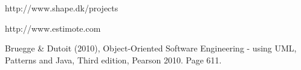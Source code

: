 \documentclass[12pt]{article}
\begin{document}
\newpage
\begin{thebibliography}{9}

http://www.shape.dk/projects

http://www.estimote.com
  
Bruegge \& Dutoit (2010), Object-Oriented Software Engineering - using UML, Patterns and Java, Third edition, Pearson 2010. Page 611.

\end{thebibliography}
\end{document}
